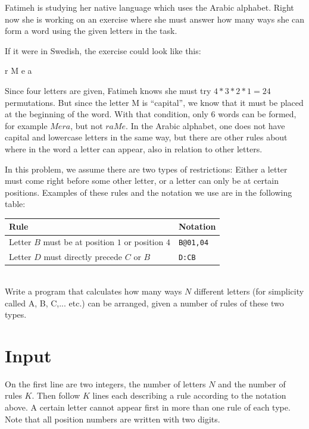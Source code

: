 
Fatimeh is studying her native language which uses the Arabic alphabet. Right now
she is working on an exercise where she must answer
how many ways she can form a word using the given letters in the task.

If it were in Swedish, the exercise could look like this:

\vspace{0.2in}
\centerline{r M e a}
\vspace{0.2in}

Since four letters are given, Fatimeh knows she must try $4*3*2*1 =
24$ permutations. But since the letter M is ``capital'', we know
that it must be placed at the beginning of the word. With that condition, only $6$
words can be formed, for example $Mera$, but
not $raMe$. In the Arabic alphabet, one does not have capital and lowercase letters
in the same way, but there are other rules about where
in the word a letter can appear, also in relation to other
letters.

In this problem, we assume there are two types of restrictions: Either a letter must come right before
some other letter, or a letter can only be at certain
positions. Examples of these rules and the notation we use are in
the following table:
\\
\begin{tabular}{|l|l|} \hline
\textbf{Rule} & \textbf{Notation} \\ \hline
Letter $B$ must be at position $1$ or position $4$ & \texttt{B@01,04}
\\ \hline
Letter $D$ must directly precede $C$ or $B$  & \texttt{D:CB} \\ \hline
\end{tabular}
\\
Write a program that calculates
how many ways $N$ different letters (for simplicity called A,
B, C,... etc.) can be arranged, given a number of rules of these two
types.

\section*{Input}

On the first line are two integers, the number of letters $N$
and the number of rules $K$. Then follow $K$ lines each describing
a rule according to the notation above. A certain letter cannot appear first in more than one rule of each type. Note that all position numbers are written with two digits.

